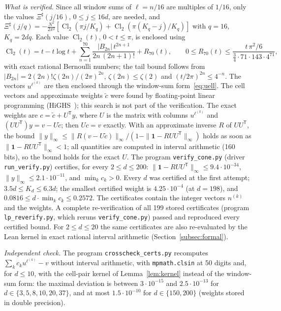 \documentclass[11pt]{amsart}
\theoremstyle{definition}
\theoremstyle{remark}
\numberwithin{equation}{section}
\newcommand{\Cl}{\operatorname{Cl}_2}
\newcommand{\one}{\mathbf{1}}
\newcommand{\Sh}{\Xi^{\sharp}}
\begin{document}
\emph{What is verified.} Since all window sums of $\ell=n/16$ are multiples of $1/16$, only the values $\Sh(j/16)$,
$0\le j\le16d$, are needed, and
$\Sh(j/q)=-\frac{N^2}{2\pi^2}[\Cl(\pi j/K_q)+\Cl(\pi(K_q-j)/K_q)]$ with $q=16$, $K_q=2dq$. Each value $\Cl(t)$, $0<t\le\pi$, is
enclosed using
\[
\Cl(t)=t-t\log t+\sum_{n=1}^{70}\frac{|B_{2n}|\,t^{2n+1}}{2n\,(2n+1)!}+R_{70}(t),\qquad
0\le R_{70}(t)\le\frac{t\,\pi^2/6}{\frac34\cdot71\cdot143\cdot4^{71}},
\]
with exact rational Bernoulli numbers; the tail bound follows from $|B_{2n}|=2(2n)!\zeta(2n)/(2\pi)^{2n}$,
$\zeta(2n)\le\zeta(2)$ and $(t/2\pi)^{2n}\le4^{-n}$. The vectors $u^{\ell^{(k)}}$ are then enclosed through the window-sum
form~\eqref{eq:uell}. The cell vectors and approximate weights $\tilde c$ were found by floating-point linear
programming (HiGHS~\cite{HiGHS}); this search is not part of the verification. The exact weights are
$c=\tilde c+U^{\mathsf T}y$, where $U$ is the matrix with columns $u^{\ell^{(k)}}$ and $(UU^{\mathsf T})y=v-U\tilde c$; then
$Uc=v$ exactly. With an approximate inverse $R$ of $UU^{\mathsf T}$, the bound
$\|y\|_\infty\le\|R(v-U\tilde c)\|_\infty/(1-\|\one-RUU^{\mathsf T}\|_\infty)$ holds as soon as $\|\one-RUU^{\mathsf T}\|_\infty<1$; all
quantities are computed in interval arithmetic (160 bits), so the bound holds for the exact $U$. The program
\texttt{verify\_cone.py} (driver \texttt{run\_verify.py}) certifies, for every $2\le d\le200$:
$\|\one-RUU^{\mathsf T}\|_\infty\le9.4\cdot10^{-34}$, $\|y\|_\infty\le2.1\cdot10^{-11}$, and $\min_kc_k>0$. Every $d$ was certified
at the first attempt; $3.5d\le K_d\le6.3d$; the smallest certified weight is $4.25\cdot10^{-4}$ (at $d=198$), and
$0.0816\le d\cdot\min_kc_k\le0.2572$. The certificates contain the integer vectors $n^{(k)}$ and the weights. A complete
re-verification of all 199 stored certificates (program \texttt{lp\_reverify.py}, which reruns \texttt{verify\_cone.py})
passed and reproduced every certified bound. For $2\le d\le20$ the same certificates are also re-evaluated by the Lean
kernel in exact rational interval arithmetic (Section~\ref{subsec:formal}).

\emph{Independent check.} The program \texttt{crosscheck\_certs.py} recomputes $\sum_kc_ku^{\ell^{(k)}}-v$ without interval
arithmetic, with \texttt{mpmath.clsin} at 50 digits and, for $d\le10$, with the cell-pair kernel of
Lemma~\ref{lem:kernel} instead of the window-sum form: the maximal deviation is between $3\cdot10^{-15}$ and
$2.5\cdot10^{-13}$ for $d\in\{3,5,8,10,20,37\}$, and at most $1.5\cdot10^{-10}$ for $d\in\{150,200\}$ (weights stored in
double precision).
\end{document}
